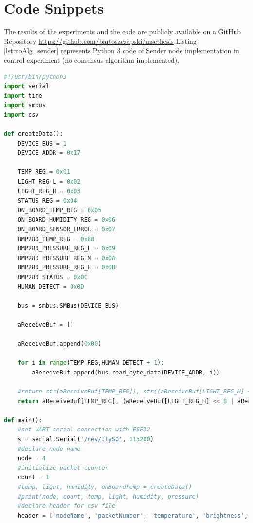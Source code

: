 \documentclass[oneside,12pt]{book}
\begin{document}
\chapter{Code Snippets}
The results of the experiments and the code are publicly available on a GitHub Repository \href{https://github.com/bartoszczapski/msc_thesis}{https://github.com/bartoszczapski/msc\textunderscore thesis}\smallskip \newline 
Listing \ref{lst:noAlg_sender} represents Python 3 code of Sender node implementation in control experiment (no consensus algorithm implemented).
\begin{lstlisting}[language={Python},caption={Sender code without consensus algorithm implementation- Python3},captionpos=b,label={lst:noAlg_sender}]
#!/usr/bin/python3
import serial
import time
import smbus
import csv

def createData():
    DEVICE_BUS = 1
    DEVICE_ADDR = 0x17

    TEMP_REG = 0x01
    LIGHT_REG_L = 0x02
    LIGHT_REG_H = 0x03
    STATUS_REG = 0x04
    ON_BOARD_TEMP_REG = 0x05
    ON_BOARD_HUMIDITY_REG = 0x06
    ON_BOARD_SENSOR_ERROR = 0x07
    BMP280_TEMP_REG = 0x08
    BMP280_PRESSURE_REG_L = 0x09
    BMP280_PRESSURE_REG_M = 0x0A
    BMP280_PRESSURE_REG_H = 0x0B
    BMP280_STATUS = 0x0C
    HUMAN_DETECT = 0x0D

    bus = smbus.SMBus(DEVICE_BUS)

    aReceiveBuf = []

    aReceiveBuf.append(0x00)

    for i in range(TEMP_REG,HUMAN_DETECT + 1):
        aReceiveBuf.append(bus.read_byte_data(DEVICE_ADDR, i))

    #return str(aReceiveBuf[TEMP_REG]), str((aReceiveBuf[LIGHT_REG_H] << 8 | aReceiveBuf[LIGHT_REG_L])), str(aReceiveBuf[ON_BOARD_HUMIDITY_REG]), str((aReceiveBuf[BMP280_PRESSURE_REG_L] | aReceiveBuf[BMP280_PRESSURE_REG_M] << 8 | aReceiveBuf[BMP280_PRESSURE_REG_H] << 16))
    return aReceiveBuf[TEMP_REG], (aReceiveBuf[LIGHT_REG_H] << 8 | aReceiveBuf[LIGHT_REG_L]), aReceiveBuf[ON_BOARD_HUMIDITY_REG], aReceiveBuf[ON_BOARD_TEMP_REG]

def main():
    #set UART serial connection with ESP32
    s = serial.Serial('/dev/ttyS0', 115200)
    #declare node name
    node = 4
    #initialize packet counter
    count = 1
    #temp, light, humidity, onBoardTemp = createData()
    #print(node, count, temp, light, humidity, pressure)
    #declare header for csv file
    header = ['nodeName', 'packetNumber', 'temperature', 'brightness', 'humidity', 'onBoardTemp']  
   

\end{lstlisting}
\end{document}
